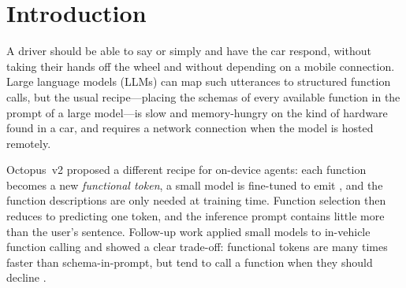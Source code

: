 \section{Introduction}
\label{sec:intro}

A driver should be able to say  or simply  and have the car respond, without taking their hands off the wheel and without depending on a mobile
connection. Large language models (LLMs) can map such utterances to structured function calls, but the usual recipe---placing
the schemas of every available function in the prompt of a large model---is slow and memory-hungry on the kind of hardware
found in a car, and requires a network connection when the model is hosted remotely.

Octopus~v2 \citep{chen2024octopus} proposed a different recipe for on-device agents: each function becomes a new
\emph{functional token}, a small model is fine-tuned to emit , and the function descriptions
are only needed at training time. Function selection then reduces to predicting one token, and the inference prompt contains
little more than the user's sentence. Follow-up work applied small models to in-vehicle function calling
\citep{sowti2025optimizing,jafarzadeh2026fixedkeys} and showed a clear trade-off: functional tokens are many times faster than
schema-in-prompt, but tend to call a function when they should decline \citep{jafarzadeh2026fixedkeys}.

